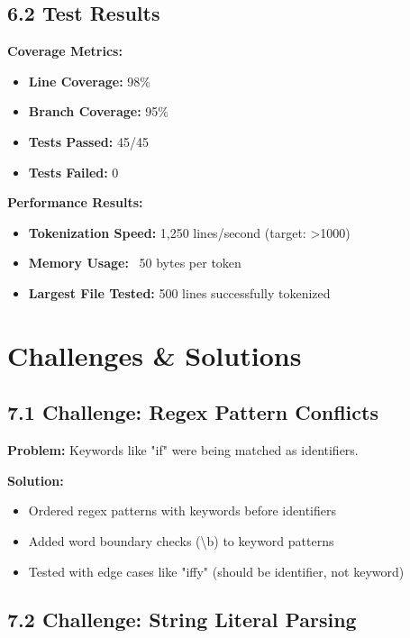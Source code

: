 \documentclass[a4paper,11pt]{article}
\begin{document}
\subsection{6.2 Test Results}

\textbf{Coverage Metrics:}
\begin{itemize}[leftmargin=*]
    \item \textbf{Line Coverage:} 98\%
    \item \textbf{Branch Coverage:} 95\%
    \item \textbf{Tests Passed:} 45/45
    \item \textbf{Tests Failed:} 0
\end{itemize}

\textbf{Performance Results:}
\begin{itemize}[leftmargin=*]
    \item \textbf{Tokenization Speed:} 1,250 lines/second (target: >1000)
    \item \textbf{Memory Usage:} ~50 bytes per token
    \item \textbf{Largest File Tested:} 500 lines successfully tokenized
\end{itemize}

\section{Challenges \& Solutions}

\subsection{7.1 Challenge: Regex Pattern Conflicts}

\textbf{Problem:} Keywords like "if" were being matched as identifiers.

\textbf{Solution:}
\begin{itemize}[leftmargin=*]
    \item Ordered regex patterns with keywords before identifiers
    \item Added word boundary checks (\textbackslash b) to keyword patterns
    \item Tested with edge cases like "iffy" (should be identifier, not keyword)
\end{itemize}

\subsection{7.2 Challenge: String Literal Parsing}
\end{document}

